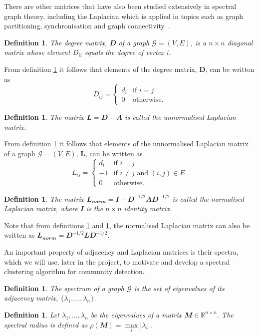 \documentclass[12pt]{article}
\numberwithin{equation}{section}
\newtheorem{definition}[theorem]{Definition}
\begin{document}
There are other matrices that have also been studied extensively in spectral graph theory, including the Laplacian which is applied in topics such as graph partitioning, synchronisation and graph connectivity~\cite{For10}.
\begin{definition}
\label{def:degreeMatrix}
	The degree matrix, $\mathbfit{D}$ of a graph $\mathcal{G} = (V,E)$, is a $n \times n$ diagonal matrix whose element $D_{ii}$ equals the degree of vertex $i$.
\end{definition}
From definition \ref{def:degreeMatrix} it follows that elements of the degree matrix, $\mathbf{D}$, can be written as
\begin{equation*}
	 D_{ij} =
	\begin{cases}
		d_{i} & \text{if } i = j\\
		0 & \text{otherwise}.
	\end{cases}
\end{equation*}
\begin{definition}
\label{def:unnormalisedLaplacianMatrix}
	The matrix $\mathbfit{L} = \mathbfit{D}  - \mathbfit{A} $ is called the unnormalised Laplacian matrix.
\end{definition}
From definition \ref{def:unnormalisedLaplacianMatrix} it follows that elements of the unnormalised Laplacian matrix of a graph $\mathcal{G} = (V,E)$, $\mathbf{L}$, can be written as
\begin{equation*}
	L_{ij} =
	\begin{cases}
		d_{i} & \text{if } i = j\\
		-1 & \text{if } i \neq j \text{ and }  (i,j) \in E\\
		0 & \text{otherwise}.
	\end{cases}
\end{equation*}
\begin{definition}
\label{def:normalisedLaplacianMatrix}
	The matrix $\mathbfit{L_{norm}} = \mathbfit{I}  - \mathbfit{D}^{-1/2}\mathbfit{A}\mathbfit{D}^{-1/2}$ is called the normalised Laplacian matrix, where $\mathbfit{I}$ is the $n \times n$ identity matrix.
\end{definition}
Note that from definitions \ref{def:unnormalisedLaplacianMatrix} and \ref{def:normalisedLaplacianMatrix}, the normalised Laplacian matrix can also be written as $\mathbfit{L_{norm}} = \mathbfit{D}^{-1/2}\mathbfit{L}\mathbfit{D}^{-1/2}$.

An important property of adjacency and Laplacian matrices is their spectra, which we will use, later in the project, to motivate and develop a spectral clustering algorithm for community detection.
\begin{definition}
\label{def:spectrum}
	The spectrum of a graph $\mathcal{G}$ is the set of eigenvalues of its adjacency matrix, $\{\lambda_{1},\dots,\lambda_{n}\}$.
\end{definition}
\begin{definition}
\label{def:spectralRadius}
	Let $\lambda_{1},\dots,\lambda_{n}$ be the eigenvalues of a matrix $\mathbfit{M} \in \mathbb{R}^{n \times n}$. The spectral radius is defined as $\rho(\mathbfit{M}) = \max\limits_{i} \vert\lambda_{i}\vert$.
\end{definition}
\end{document}
